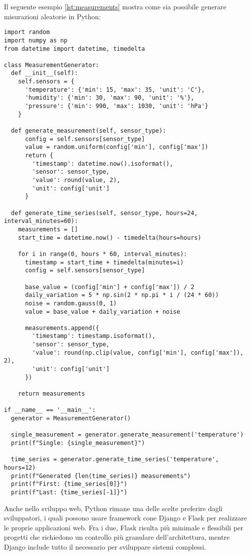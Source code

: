 Il seguente esempio \ref{lst:measurements} mostra come sia possibile generare misurazioni aleatorie in Python:

\begin{lstlisting}[caption={Generazioni misuarzioni aleatorie in Python}, label=lst:measurements]
import random
import numpy as np
from datetime import datetime, timedelta

class MeasurementGenerator:
  def __init__(self):
    self.sensors = {
      'temperature': {'min': 15, 'max': 35, 'unit': 'C'},
      'humidity': {'min': 30, 'max': 90, 'unit': '%'},
      'pressure': {'min': 990, 'max': 1030, 'unit': 'hPa'}
    }

  def generate_measurement(self, sensor_type):
      config = self.sensors[sensor_type]
      value = random.uniform(config['min'], config['max'])
      return {
        'timestamp': datetime.now().isoformat(),
        'sensor': sensor_type,
        'value': round(value, 2),
        'unit': config['unit']
      }

  def generate_time_series(self, sensor_type, hours=24, interval_minutes=60):
    measurements = []
    start_time = datetime.now() - timedelta(hours=hours)

    for i in range(0, hours * 60, interval_minutes):
      timestamp = start_time + timedelta(minutes=i)
      config = self.sensors[sensor_type]

      base_value = (config['min'] + config['max']) / 2
      daily_variation = 5 * np.sin(2 * np.pi * i / (24 * 60))
      noise = random.gauss(0, 1)
      value = base_value + daily_variation + noise

      measurements.append({
        'timestamp': timestamp.isoformat(),
        'sensor': sensor_type,
        'value': round(np.clip(value, config['min'], config['max']), 2),
        'unit': config['unit']
      })

    return measurements

if __name__ == '__main__':
  generator = MeasurementGenerator()

  single_measurement = generator.generate_measurement('temperature')
  print(f"Single: {single_measurement}")

  time_series = generator.generate_time_series('temperature', hours=12)
  print(f"Generated {len(time_series)} measurements")
  print(f"First: {time_series[0]}")
  print(f"Last: {time_series[-1]}")
\end{lstlisting}

Anche nello sviluppo web, Python rimane una delle scelte preferire dagli sviluppatori, i quali possono usare framework cone Django e Flask \citep{django_2023, flask_2023} per realizzare le proprie applicazioni web. Fra i due, Flask risulta più minimale e flessibili per progetti che richiedono un controllo più granulare dell'architettura, mentre Django include tutto il necessario per sviluppare sistemi complessi.

